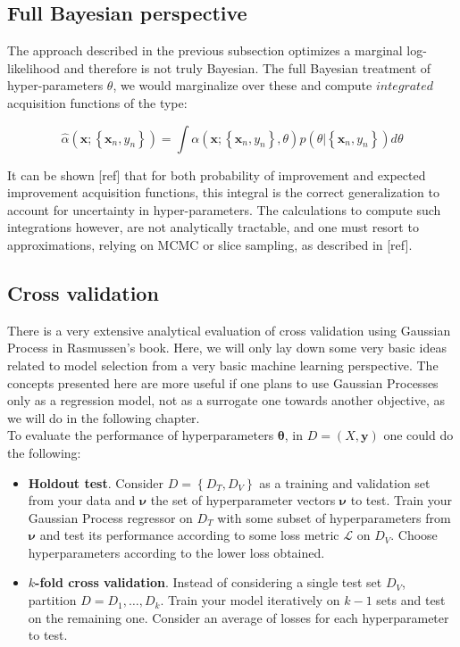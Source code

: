 \documentclass[10pt,a4paper,twoside]{book}
\begin{document}
\subsection{Full Bayesian perspective}

The approach described in the previous subsection optimizes a marginal log-likelihood and therefore is not truly Bayesian. The full Bayesian treatment of hyper-parameters $\theta$, we would marginalize over these and compute $\textit{integrated}$ acquisition functions of the type:

\begin{equation}
\hat{\alpha}(\boldsymbol{x}; \left\lbrace \boldsymbol{x}_n, y_n \right\rbrace ) = \int \alpha(\boldsymbol{x}; \left\lbrace \boldsymbol{x}_n, y_n \right\rbrace, \theta) p(\theta |\left\lbrace \boldsymbol{x}_n, y_n\right\rbrace) d\theta
\end{equation}

It can be shown [ref] that for both probability of improvement and expected improvement acquisition functions, this integral is the correct generalization to account for uncertainty in hyper-parameters. The calculations to compute such integrations however, are not analytically tractable, and one must resort to approximations, relying on MCMC or slice sampling, as described in [ref].

\subsection{Cross validation}

There is a very extensive analytical evaluation of cross validation using Gaussian Process in Rasmussen's book. Here, we will only lay down some very basic ideas related to model selection from a very basic machine learning perspective. The concepts presented here are more useful if one plans to use Gaussian Processes only as a regression model, not as a surrogate one towards another objective, as we will do in the following chapter. \\

To evaluate the performance of hyperparameters $\boldsymbol{\theta}$, in $D=\left( X, \boldsymbol{y}\right)$ one could do the following:

\begin{itemize}
\item \textbf{Holdout test}. Consider $D = \left\lbrace D_T, D_V \right\rbrace$ as a training and validation set from your data and $\boldsymbol{\nu}$ the set of hyperparameter vectors $\boldsymbol{\nu}$ to test. Train your Gaussian Process regressor on $D_T$ with some subset of hyperparameters from $\boldsymbol{\nu}$ and test its performance according to some loss metric $\mathcal{L}$ on $D_V$. Choose hyperparameters according to the lower loss obtained.
\item \textbf{$k$-fold cross validation}. Instead of considering a single test set $D_V$, partition $D={D_1,\dots, D_k}$. Train your model iteratively on $k-1$ sets and test on the remaining one. Consider an average of losses for each hyperparameter to test.  
\end{itemize}
\end{document}
